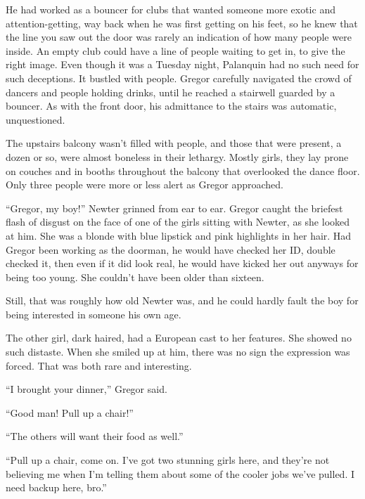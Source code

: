 He had worked as a bouncer for clubs that wanted someone more exotic and attention-getting, way back when he was first getting on his feet, so he knew that the line you saw out the door was rarely an indication of how many people were inside.  An empty club could have a line of people waiting to get in, to give the right image.  Even though it was a Tuesday night, Palanquin had no such need for such deceptions.  It bustled with people.  Gregor carefully navigated the crowd of dancers and people holding drinks, until he reached a stairwell guarded by a bouncer.  As with the front door, his admittance to the stairs was automatic, unquestioned.



The upstairs balcony wasn't filled with people, and those that were present, a dozen or so, were almost boneless in their lethargy.  Mostly girls, they lay prone on couches and in booths throughout the balcony that overlooked the dance floor.  Only three people were more or less alert as Gregor approached.



``Gregor, my boy!'' Newter grinned from ear to ear.  Gregor caught the briefest flash of disgust on the face of one of the girls sitting with Newter, as she looked at him.  She was a blonde with blue lipstick and pink highlights in her hair.  Had Gregor been working as the doorman, he would have checked her ID, double checked it, then even if it did look real, he would have kicked her out anyways for being too young.  She couldn't have been older than sixteen.



Still, that was roughly how old Newter was, and he could hardly fault the boy for being interested in someone his own age.



The other girl, dark haired, had a European cast to her features.  She showed no such distaste.  When she smiled up at him, there was no sign the expression was forced.  That was both rare and interesting.



``I brought your dinner,'' Gregor said.



``Good man!  Pull up a chair!''



``The others will want their food as well.''



``Pull up a chair, come on.  I've got two stunning girls here, and they're not believing me when I'm telling them about some of the cooler jobs we've pulled.  I need backup here, bro.''



